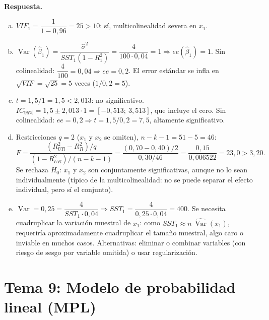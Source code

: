 \documentclass[12pt,letterpaper]{article}
\DeclareMathOperator{\var}{Var}
\newenvironment{resp}{\begingroup\color{blue}\par\noindent\textbf{Respuesta.}\ }{\par\endgroup}
\newcommand{\tema}[1]{\section*{#1}}
\begin{document}
\begin{enumerate}[1.]
\begin{resp}
\begin{enumerate}[a)]
\item $VIF_1=\dfrac{1}{1-0{,}96}=25>10$: sí, multicolinealidad severa en $x_1$.
\item $\var(\hat\beta_1)=\dfrac{\hat\sigma^2}{SST_1(1-R^2_1)}=\dfrac{4}{100\cdot0{,}04}=1\Rightarrow ee(\hat\beta_1)=1$. Sin colinealidad: $\dfrac{4}{100}=0{,}04\Rightarrow ee=0{,}2$. El error estándar se infla en $\sqrt{VIF}=\sqrt{25}=5$ veces ($1/0{,}2=5$).
\item $t=1{,}5/1=1{,}5<2{,}013$: no significativo. $IC_{95\%}=1{,}5\pm2{,}013\cdot1=[-0{,}513;\ 3{,}513]$, que incluye el cero. Sin colinealidad: $ee=0{,}2\Rightarrow t=1{,}5/0{,}2=7{,}5$, altamente significativo.
\item Restricciones $q=2$ ($x_1$ y $x_2$ se omiten), $n-k-1=51-5=46$:
\[
F=\frac{(R^2_{UR}-R^2_R)/q}{(1-R^2_{UR})/(n-k-1)}=\frac{(0{,}70-0{,}40)/2}{0{,}30/46}=\frac{0{,}15}{0{,}006522}=23{,}0>3{,}20 .
\]
Se rechaza $H_0$: $x_1$ y $x_2$ son conjuntamente significativas, aunque no lo sean individualmente (típico de la multicolinealidad: no se puede separar el efecto individual, pero sí el conjunto).
\item $\var=0{,}25=\dfrac{4}{SST_1\cdot0{,}04}\Rightarrow SST_1=\dfrac{4}{0{,}25\cdot0{,}04}=400$. Se necesita cuadruplicar la variación muestral de $x_1$: como $SST_1\approx n\,\widehat{\var}(x_1)$, requeriría aproximadamente cuadruplicar el tamaño muestral, algo caro o inviable en muchos casos. Alternativas: eliminar o combinar variables (con riesgo de sesgo por variable omitida) o usar regularización.
\end{enumerate}
\end{resp}
\end{enumerate}

\newpage
\tema{Tema 9: Modelo de probabilidad lineal (MPL)}
\end{document}
